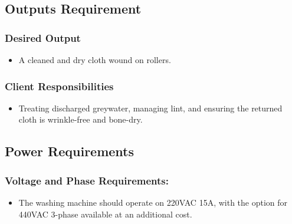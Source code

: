 \documentclass[table,french,english]{rapportCS}
\begin{document}

\subsection{ Outputs Requirement}\label{sec:outputreq}
\subsubsection{Desired Output}\label{sec:desout}
    \begin{itemize}[label=$\bullet$]
      \item A cleaned and dry cloth wound on rollers.
    \end{itemize}
    
\subsubsection{Client Responsibilities}\label{sec:clientresp}
    \begin{itemize}[label=$\bullet$]
      \item Treating discharged \gls{greywater},  managing lint, and ensuring the returned cloth is wrinkle-free and \gls{bone-dry}. 
    \end{itemize}

\subsection{ Power Requirements}\label{sec:powerreq}
\subsubsection{Voltage and Phase Requirements:}\label{sec: vnpreq}
    \begin{itemize}[label=$\bullet$]
      \item The washing machine should operate on 220VAC 15A, with the option for 440VAC 3-phase available at an additional cost.
    \end{itemize}
  
\end{document}
